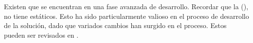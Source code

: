 \section{\dataModelAS}

Existen \dataModelsAS que se encuentran en una fase avanzada de desarrollo. Recordar que la \dataBaseDB (\mongodbNAME), no tiene \schemasDB estáticos. Esto ha sido particularmente valioso en el proceso de desarrollo de la solución, dado que variados cambios han surgido en el proceso. Estos \dataModelsAS pueden ser revisados en .

